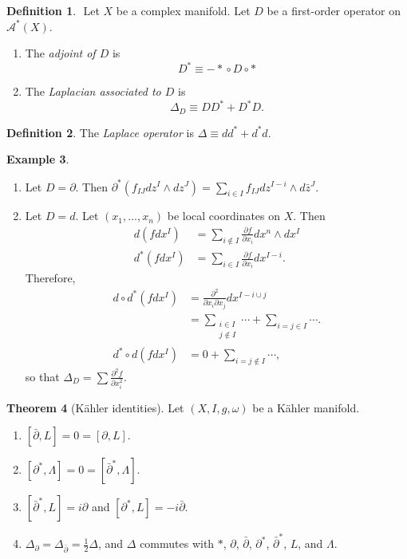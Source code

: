 \documentclass[10pt,letterpaper,cm]{nupset}
\theoremstyle{definition}
\newtheorem{defn}{Definition}[subsection]
\newtheorem{exmp}[defn]{Example}
\theoremstyle{theorem}
\newtheorem{theorem}[defn]{Theorem}
\theoremstyle{remark}
\newcommand{\A}{\mathcal A}
\newcommand{\1}{\mathbb{1}}
\newcommand{\0}{\vec 0}
\newcommand{\be}{\begin{enumerate}}
\newcommand{\ee}{\end{enumerate}}
\begin{document}
\begin{defn} $ $
Let $X$ be  a complex manifold. Let $D$ be a first-order operator on $\A^{\ast}\left(X\right)$.  
\be 
\item The \textit{adjoint of $D$} is
\[ 
D^{\ast} \equiv {-\ast} \circ D \circ \ast 
\]
\item The \textit{Laplacian associated to $D$} is 
\[
\Delta_D \equiv D{D^{\ast}} + D^{\ast}{D}.
\]
\ee
\end{defn}

\begin{defn}
The \textit{Laplace operator} is $\Delta \equiv d{d^{\ast}} + d^{\ast}{d}$.
\end{defn}

\begin{exmp} $ $
\be
\item Let $D = \partial$. Then $\partial^{\ast}\left(f_{IJ}d{z}^I \wedge d{z}^J\right) = \sum_{i\in I}f_{IJ}d{z}^{I-i}\wedge d{\bar{z}}^J$.
\item Let $D = d$. Let $\left(x_1, \ldots, x_n\right)$ be local coordinates on $X$. Then
\begin{align*}
d\left(fdx^I\right) & = \sum_{i\notin I} \frac{\partial{f}}{\partial{x_i}}d{x^n}\wedge d{x}^I
\\  d^{\ast}\left(fdx^I\right) & =  \sum_{i\in I}\frac{\partial{f}}{\partial{x_i}}d{x}^{I-i}.
\end{align*}
Therefore,
\begin{align*}
d\circ d^{\ast}\left(fdx^I\right)  & = \frac{\partial^2}{\partial{x_i}\partial{x_j}}d{x}^{I-i \cup j}
\\ & = \sum_{\substack{i\in I \\ j \notin I}}\cdots +\sum_{i=j \in I}\cdots.
\\ d^{\ast}\circ d\left(fd{x}^I\right) &=0 + \sum_{i=j\notin I}\cdots ,
\end{align*}
so that $\Delta_D =\sum \frac{\partial^{2}{f}}{\partial{x_i^2}}$.
\ee
\end{exmp}

\begin{theorem}[K\"ahler identities]\label{Kid} Let $\left(X, I, g, \omega\right)$ be a K\"ahler manifold.
\be
\item $\left[\bar{\partial}, L\right] =0 = \left[\partial, L\right]$.
\item $\left[\partial^{\ast}, \Lambda \right] =0 = \left[\bar{\partial}^{\ast}, \Lambda\right]$.
\item $\left[\bar{\partial}^{\ast}, L\right] =i\partial$ and $\left[\partial^{\ast}, L\right] = {-i\bar{\partial}}$.
\item $\Delta_{\partial} = \Delta_{\bar{\partial}} =\frac{1}{2}\Delta$, and $\Delta$ commutes with $\ast$, $\partial$, $\bar{\partial}$, $\partial^{\ast}$, $\bar{\partial}^{\ast}$, $L$, and $\Lambda$.
\ee
\end{theorem}
\end{document}
